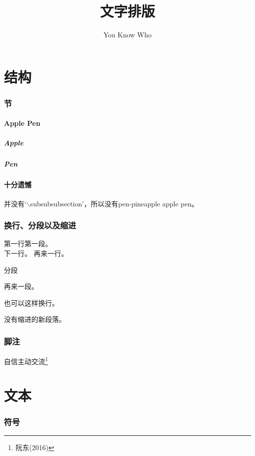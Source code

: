 \documentclass[12pt]{article}
\author{You Know Who}
\title{文字排版}
\begin{document}
\maketitle
\newpage

\tableofcontents
\newpage

\part{结构}
\section{节}
\subsection{Apple Pen}
\subsubsection{Apple}
\subsubsection{Pen}
\subsection*{十分遗憾}
并没有`$\backslash$subsubsubsection'，所以没有pen-pineapple apple pen。

\section{换行、分段以及缩进}
第一行第一段。\\
下一行。\newline
\indent 再来一行。

分段\par
再来一段。

也可以这样换行。

\noindent 没有缩进的新段落。

\section{脚注}
自信主动交流\footnote{阮东(2016)}

\part{文本}
\section{符号}\label{sec1}
\end{document}
